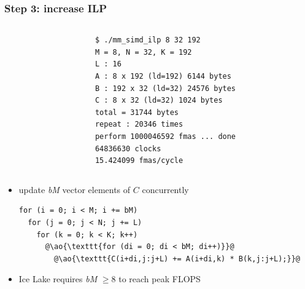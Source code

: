 \documentclass[12pt,dvipdfmx]{beamer}
\newcommand{\ao}[1]{{\color{blue}#1}}
\begin{document}
\begin{frame}[fragile]
\frametitle{Step 3: increase ILP}
\begin{columns}
  \begin{column}{0.55\textwidth}
\begin{center}
\def\svgwidth{0.8\textwidth}
%
%
\end{center}
  \end{column}
  \begin{column}{0.4\textwidth}
\begin{lstlisting}
$ ./mm_simd_ilp 8 32 192
M = 8, N = 32, K = 192
L : 16
A : 8 x 192 (ld=192) 6144 bytes
B : 192 x 32 (ld=32) 24576 bytes
C : 8 x 32 (ld=32) 1024 bytes
total = 31744 bytes
repeat : 20346 times
perform 1000046592 fmas ... done
64836630 clocks
15.424099 fmas/cycle
\end{lstlisting}%
  \end{column}
\end{columns}

\begin{itemize}
\item update {\it bM} vector elements of $C$ concurrently
\begin{lstlisting}
for (i = 0; i < M; i += bM)
  for (j = 0; j < N; j += L)  
    for (k = 0; k < K; k++)  
      @\ao{\texttt{for (di = 0; di < bM; di++)}}@
        @\ao{\texttt{C(i+di,j:j+L) += A(i+di,k) * B(k,j:j+L);}}@
\end{lstlisting}

\item Ice Lake requires {\it bM} $\geq 8$ to reach peak FLOPS
\end{itemize}
\end{frame}
\end{document}
